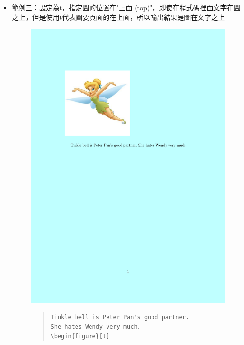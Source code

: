 \documentclass[12pt,a4paper]{report}
\begin{document}
\begin{CJK}{UTF8}{bkai}
\begin{itemize}
\item 範例三：設定為t，指定圖的位置在"上面 (top)"，即使在程式碼裡面文字在圖之上，但是使用t代表圖要頁面的在上面，所以輸出結果是圖在文字之上
\begin{figure}[!h] 
\begin{minipage}[b]{0.5\textwidth} 
\centering 
\includegraphics[scale=0.3]{./pics/float_example_9.pdf} 
\end{minipage}%
\begin{minipage}[b]{0.5\textwidth} 
\begin{footnotesize}
\begin{quote}
\begin{verbatim}
Tinkle bell is Peter Pan's good partner. 
She hates Wendy very much.
\begin{figure}[t]

\end{verbatim}
\end{quote}
\end{footnotesize}
\end{minipage}
\end{figure}
\end{itemize}
\end{CJK}
\end{document}
